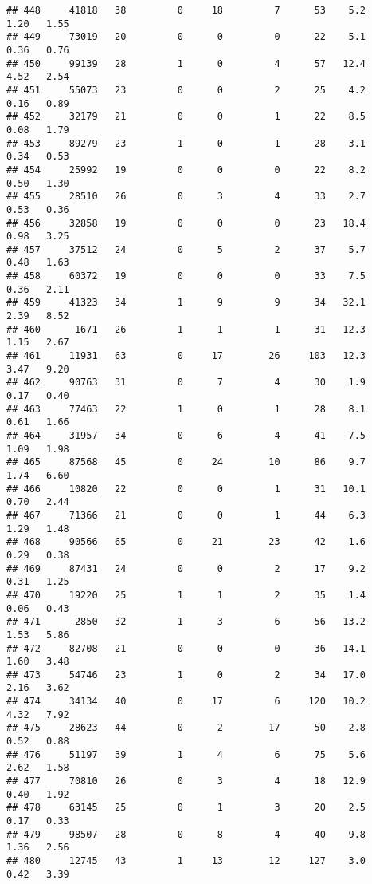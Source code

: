 \documentclass[
]{article}
\begin{document}
\begin{verbatim}
## 448     41818   38         0     18         7      53    5.2    1.20   1.55
## 449     73019   20         0      0         0      22    5.1    0.36   0.76
## 450     99139   28         1      0         4      57   12.4    4.52   2.54
## 451     55073   23         0      0         2      25    4.2    0.16   0.89
## 452     32179   21         0      0         1      22    8.5    0.08   1.79
## 453     89279   23         1      0         1      28    3.1    0.34   0.53
## 454     25992   19         0      0         0      22    8.2    0.50   1.30
## 455     28510   26         0      3         4      33    2.7    0.53   0.36
## 456     32858   19         0      0         0      23   18.4    0.98   3.25
## 457     37512   24         0      5         2      37    5.7    0.48   1.63
## 458     60372   19         0      0         0      33    7.5    0.36   2.11
## 459     41323   34         1      9         9      34   32.1    2.39   8.52
## 460      1671   26         1      1         1      31   12.3    1.15   2.67
## 461     11931   63         0     17        26     103   12.3    3.47   9.20
## 462     90763   31         0      7         4      30    1.9    0.17   0.40
## 463     77463   22         1      0         1      28    8.1    0.61   1.66
## 464     31957   34         0      6         4      41    7.5    1.09   1.98
## 465     87568   45         0     24        10      86    9.7    1.74   6.60
## 466     10820   22         0      0         1      31   10.1    0.70   2.44
## 467     71366   21         0      0         1      44    6.3    1.29   1.48
## 468     90566   65         0     21        23      42    1.6    0.29   0.38
## 469     87431   24         0      0         2      17    9.2    0.31   1.25
## 470     19220   25         1      1         2      35    1.4    0.06   0.43
## 471      2850   32         1      3         6      56   13.2    1.53   5.86
## 472     82708   21         0      0         0      36   14.1    1.60   3.48
## 473     54746   23         1      0         2      34   17.0    2.16   3.62
## 474     34134   40         0     17         6     120   10.2    4.32   7.92
## 475     28623   44         0      2        17      50    2.8    0.52   0.88
## 476     51197   39         1      4         6      75    5.6    2.62   1.58
## 477     70810   26         0      3         4      18   12.9    0.40   1.92
## 478     63145   25         0      1         3      20    2.5    0.17   0.33
## 479     98507   28         0      8         4      40    9.8    1.36   2.56
## 480     12745   43         1     13        12     127    3.0    0.42   3.39

\end{verbatim}
\end{document}
